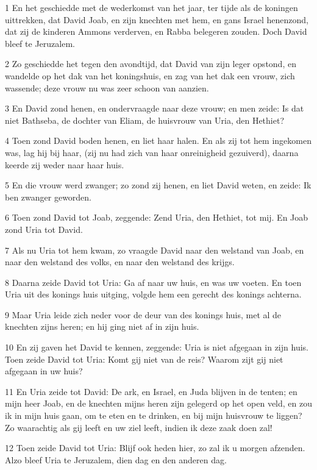 \par 1 En het geschiedde met de wederkomst van het jaar, ter tijde als de koningen uittrekken, dat David Joab, en zijn knechten met hem, en gans Israel henenzond, dat zij de kinderen Ammons verderven, en Rabba belegeren zouden. Doch David bleef te Jeruzalem.
\par 2 Zo geschiedde het tegen den avondtijd, dat David van zijn leger opstond, en wandelde op het dak van het koningshuis, en zag van het dak een vrouw, zich wassende; deze vrouw nu was zeer schoon van aanzien.
\par 3 En David zond henen, en ondervraagde naar deze vrouw; en men zeide: Is dat niet Bathseba, de dochter van Eliam, de huisvrouw van Uria, den Hethiet?
\par 4 Toen zond David boden henen, en liet haar halen. En als zij tot hem ingekomen was, lag hij bij haar, (zij nu had zich van haar onreinigheid gezuiverd), daarna keerde zij weder naar haar huis.
\par 5 En die vrouw werd zwanger; zo zond zij henen, en liet David weten, en zeide: Ik ben zwanger geworden.
\par 6 Toen zond David tot Joab, zeggende: Zend Uria, den Hethiet, tot mij. En Joab zond Uria tot David.
\par 7 Als nu Uria tot hem kwam, zo vraagde David naar den welstand van Joab, en naar den welstand des volks, en naar den welstand des krijgs.
\par 8 Daarna zeide David tot Uria: Ga af naar uw huis, en was uw voeten. En toen Uria uit des konings huis uitging, volgde hem een gerecht des konings achterna.
\par 9 Maar Uria leide zich neder voor de deur van des konings huis, met al de knechten zijns heren; en hij ging niet af in zijn huis.
\par 10 En zij gaven het David te kennen, zeggende: Uria is niet afgegaan in zijn huis. Toen zeide David tot Uria: Komt gij niet van de reis? Waarom zijt gij niet afgegaan in uw huis?
\par 11 En Uria zeide tot David: De ark, en Israel, en Juda blijven in de tenten; en mijn heer Joab, en de knechten mijns heren zijn gelegerd op het open veld, en zou ik in mijn huis gaan, om te eten en te drinken, en bij mijn huisvrouw te liggen? Zo waarachtig als gij leeft en uw ziel leeft, indien ik deze zaak doen zal!
\par 12 Toen zeide David tot Uria: Blijf ook heden hier, zo zal ik u morgen afzenden. Alzo bleef Uria te Jeruzalem, dien dag en den anderen dag.
